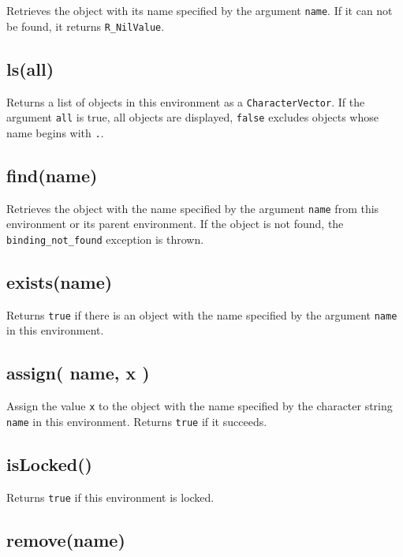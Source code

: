 \documentclass[]{book}
\begin{document}
Retrieves the object with its name specified by the argument \texttt{name}. If it can not be found, it returns \texttt{R\_NilValue}.

\hypertarget{lsall}{%
\subsection{ls(all)}\label{lsall}}

Returns a list of objects in this environment as a \texttt{CharacterVector}. If the argument \texttt{all} is true, all objects are displayed, \texttt{false} excludes objects whose name begins with \texttt{.}.

\hypertarget{findname}{%
\subsection{find(name)}\label{findname}}

Retrieves the object with the name specified by the argument \texttt{name} from this environment or its parent environment. If the object is not found, the \texttt{binding\_not\_found} exception is thrown.

\hypertarget{existsname}{%
\subsection{exists(name)}\label{existsname}}

Returns \texttt{true} if there is an object with the name specified by the argument \texttt{name} in this environment.

\hypertarget{assign-name-x}{%
\subsection{assign( name, x )}\label{assign-name-x}}

Assign the value \texttt{x} to the object with the name specified by the character string \texttt{name} in this environment. Returns \texttt{true} if it succeeds.

\hypertarget{islocked}{%
\subsection{isLocked()}\label{islocked}}

Returns \texttt{true} if this environment is locked.

\hypertarget{removename}{%
\subsection{remove(name)}\label{removename}}
\end{document}
